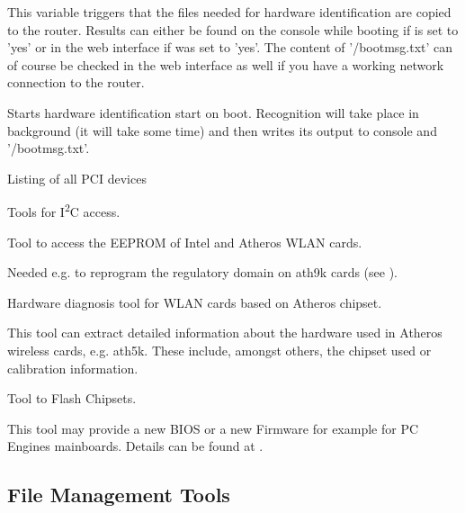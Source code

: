 \begin{description}

   This variable
  triggers that the files needed for hardware identification are copied to
  the router. Results can either be found on the console while booting if
   is set to 'yes' or in the web interface
  if  was set to 'yes'. The content of
  '/bootmsg.txt' can of course be checked in the web interface as well
  if you have a working network connection to the router.

   Starts
  hardware identification start on boot. Recognition will take place in
  background (it will take some time) and then writes its output to console
  and '/bootmsg.txt'.

 Listing of all PCI devices

 Tools for
I\textsuperscript{2}C access.

 Tool to access the
EEPROM of Intel and Atheros WLAN cards.

Needed e.g. to reprogram the regulatory domain on ath9k cards
(see ).

 Hardware diagnosis tool
for WLAN cards based on Atheros chipset.

This tool can extract detailed information about the hardware used in Atheros
wireless cards, e.g. ath5k. These include, amongst others, the chipset used or
calibration information.

 Tool to Flash Chipsets.

This tool may provide a new BIOS or a new Firmware for example for PC Engines mainboards.
Details can be found at .

\end{description}

\subsection{File Management Tools}

